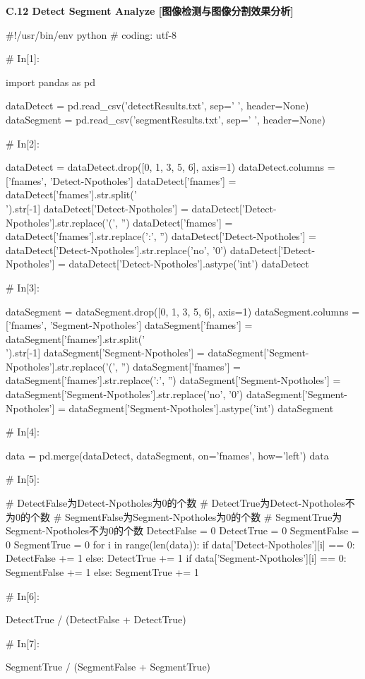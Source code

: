 \documentclass{MathorCupmodeling}
\begin{document}
\textbf{C.12 Detect Segment Analyze [图像检测与图像分割效果分析]}
\begin{python}
#!/usr/bin/env python
# coding: utf-8

# In[1]:


import pandas as pd

dataDetect = pd.read_csv('detectResults.txt', sep=' ', header=None)
dataSegment = pd.read_csv('segmentResults.txt', sep=' ', header=None)

# In[2]:


dataDetect = dataDetect.drop([0, 1, 3, 5, 6], axis=1)
dataDetect.columns = ['fnames', 'Detect-Npotholes']
dataDetect['fnames'] = dataDetect['fnames'].str.split('\\').str[-1]
dataDetect['Detect-Npotholes'] = dataDetect['Detect-Npotholes'].str.replace('(', '')
dataDetect['fnames'] = dataDetect['fnames'].str.replace(':', '')
dataDetect['Detect-Npotholes'] = dataDetect['Detect-Npotholes'].str.replace('no', '0')
dataDetect['Detect-Npotholes'] = dataDetect['Detect-Npotholes'].astype('int')
dataDetect

# In[3]:


dataSegment = dataSegment.drop([0, 1, 3, 5, 6], axis=1)
dataSegment.columns = ['fnames', 'Segment-Npotholes']
dataSegment['fnames'] = dataSegment['fnames'].str.split('\\').str[-1]
dataSegment['Segment-Npotholes'] = dataSegment['Segment-Npotholes'].str.replace('(', '')
dataSegment['fnames'] = dataSegment['fnames'].str.replace(':', '')
dataSegment['Segment-Npotholes'] = dataSegment['Segment-Npotholes'].str.replace('no', '0')
dataSegment['Segment-Npotholes'] = dataSegment['Segment-Npotholes'].astype('int')
dataSegment

# In[4]:


data = pd.merge(dataDetect, dataSegment, on='fnames', how='left')
data

# In[5]:


# DetectFalse为Detect-Npotholes为0的个数
# DetectTrue为Detect-Npotholes不为0的个数
# SegmentFalse为Segment-Npotholes为0的个数
# SegmentTrue为Segment-Npotholes不为0的个数
DetectFalse = 0
DetectTrue = 0
SegmentFalse = 0
SegmentTrue = 0
for i in range(len(data)):
    if data['Detect-Npotholes'][i] == 0:
        DetectFalse += 1
    else:
        DetectTrue += 1
    if data['Segment-Npotholes'][i] == 0:
        SegmentFalse += 1
    else:
        SegmentTrue += 1

# In[6]:


DetectTrue / (DetectFalse + DetectTrue)

# In[7]:


SegmentTrue / (SegmentFalse + SegmentTrue)
\end{python}
\end{document}
